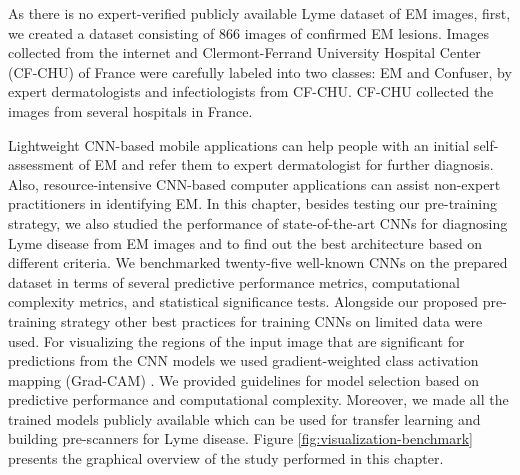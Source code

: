As there is no expert-verified publicly available Lyme dataset of EM images, first, we created a dataset consisting of 866 images of confirmed EM lesions. Images collected from the internet and Clermont-Ferrand University Hospital Center (CF-CHU) of France were carefully labeled into two classes: EM and Confuser, by expert dermatologists and infectiologists from CF-CHU. CF-CHU collected the images from several hospitals in France.

Lightweight CNN-based mobile applications can help people with an initial self-assessment of EM and refer them to expert dermatologist for further diagnosis. Also, resource-intensive CNN-based computer applications can assist non-expert practitioners in identifying EM. In this chapter, besides testing our pre-training strategy, we also studied the performance of state-of-the-art CNNs for diagnosing Lyme disease from EM images and to find out the best architecture based on different criteria. We benchmarked twenty-five well-known CNNs on the prepared dataset in terms of several predictive performance metrics, computational complexity metrics, and statistical significance tests. Alongside our proposed pre-training strategy other best practices for training CNNs on limited data were used. For visualizing the regions of the input image that are significant for predictions from the CNN models we used gradient-weighted class activation mapping (Grad-CAM) \cite{Selvaraju2020}. We provided guidelines for model selection based on predictive performance and computational complexity. Moreover, we made all the trained models publicly available which can be used for transfer learning and building pre-scanners for Lyme disease. Figure \ref{fig:visualization-benchmark} presents the graphical overview of the study performed in this chapter.

